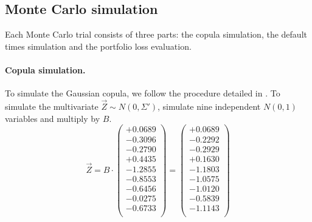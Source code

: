 \documentclass[a4paper,12pt,final]{article}
\begin{document}
\subsection{Monte Carlo simulation}

Each Monte Carlo trial consists of three parts: the copula simulation, the default 
times simulation and the portfolio loss evaluation.

\paragraph{Copula simulation.} To simulate the Gaussian copula, we follow  the 
procedure detailed in \cite{ccruncher:astin}. To simulate the multivariate
$\vec{Z} \sim N(0,\Sigma')$, simulate nine independent $N(0,1)$ variables and 
multiply by $B$.
{\small
\begin{displaymath}
\vec{Z} = B \cdot
\left(
\begin{array}{c}
  +0.0689 \\
  -0.3096 \\
  -0.2790 \\
  +0.4435 \\
  -1.2855 \\
  -0.8553 \\
  -0.6456 \\
  -0.0275 \\
  -0.6733 \\
\end{array}
\right) 
=
\left(
\begin{array}{c}
  +0.0689 \\
  -0.2292 \\
  -0.2929 \\
  +0.1630 \\
  -1.1803 \\
  -1.0575 \\
  -1.0120 \\
  -0.5839 \\
  -1.1143 \\
\end{array}
\right) 
\end{displaymath}
}
\end{document}
